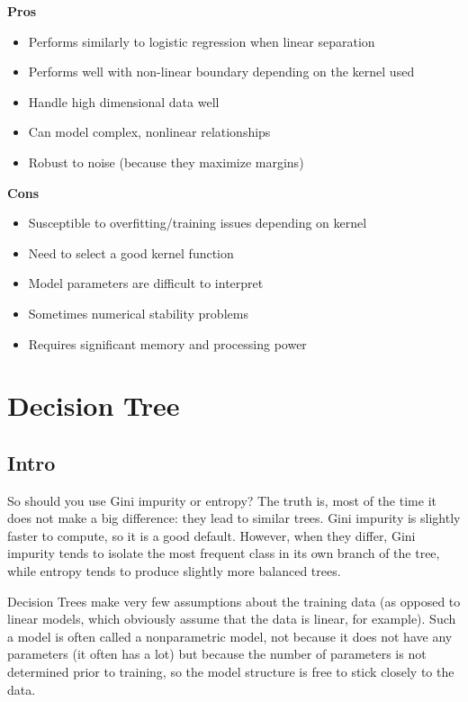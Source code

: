 \documentclass[]{book}
\begin{document}
\textbf{Pros}

\begin{itemize}
\item
  Performs similarly to logistic regression when linear separation
\item
  Performs well with non-linear boundary depending on the kernel used
\item
  Handle high dimensional data well
\item
  Can model complex, nonlinear relationships
\item
  Robust to noise (because they maximize margins)
\end{itemize}

\textbf{Cons}

\begin{itemize}
\item
  Susceptible to overfitting/training issues depending on kernel
\item
  Need to select a good kernel function
\item
  Model parameters are difficult to interpret
\item
  Sometimes numerical stability problems
\item
  Requires significant memory and processing power
\end{itemize}

\hypertarget{decision-tree}{%
\section{Decision Tree}\label{decision-tree}}

\hypertarget{intro-5}{%
\subsection{Intro}\label{intro-5}}

So should you use Gini impurity or entropy? The truth is, most of the time it does not make a big difference: they lead to similar trees. Gini impurity is slightly faster to compute, so it is a good default. However, when they differ, Gini impurity tends to isolate the most frequent class in its own branch of the tree, while entropy tends to produce slightly more balanced trees.

Decision Trees make very few assumptions about the training data (as opposed to linear models, which obviously assume that the data is linear, for example). Such a model is often called a nonparametric model, not because it does not have any parameters (it often has a lot) but because the number of parameters is not determined prior to training, so the model structure is free to stick closely to the data.
\end{document}
